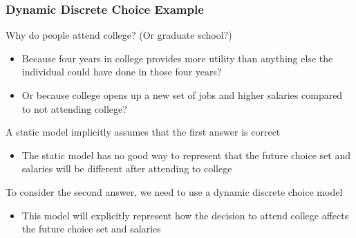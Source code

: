 \documentclass{beamer}
\begin{document}
\begin{frame}\frametitle{Dynamic Discrete Choice Example}
    Why do people attend college? (Or graduate school?)
    \begin{itemize}
        \item Because four years in college provides more utility than anything else the individual could have done in those four years?
        \item Or because college opens up a new set of jobs and higher salaries compared to not attending college?
    \end{itemize}
    \vspace{3ex}
    A static model implicitly assumes that the first answer is correct
    \begin{itemize}
        \item The static model has no good way to represent that the future choice set and salaries will be different after attending to college
    \end{itemize}
    \vspace{3ex}
    To consider the second answer, we need to use a dynamic discrete choice model
    \begin{itemize}
        \item This model will explicitly represent how the decision to attend college affects the future choice set and salaries
    \end{itemize}
\end{frame}
\end{document}
